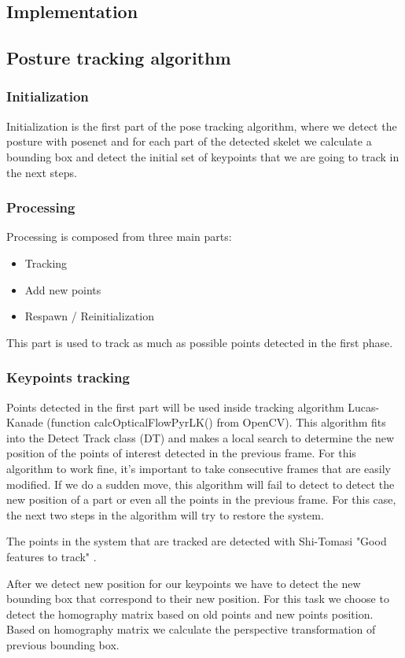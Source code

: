 \subsection{Implementation}
\subsection{Posture tracking algorithm}

\subsubsection{Initialization}
Initialization is the first part of the pose tracking algorithm, where we detect the posture with posenet and for each part of the detected skelet we calculate a bounding box and detect the initial set of keypoints that we are going to track in the next steps.
\subsubsection{Processing}
Processing is composed from three main parts: 
\begin{itemize}
    \item Tracking 
    \item Add new points 
    \item Respawn / Reinitialization
\end{itemize}
This part is used to track as much as possible points detected in the first phase.

\subsubsection{Keypoints tracking}
\par Points detected in the first part will be used inside tracking algorithm Lucas-Kanade \cite{Lucas:1981:IIR:1623264.1623280} (function calcOpticalFlowPyrLK() from OpenCV). This algorithm fits into the Detect Track  class (DT) and makes a local search to determine the new position of the points of interest detected in the previous frame. For this algorithm to work fine, it's important to take consecutive frames that are easily modified. If we do a sudden move, this algorithm will fail to detect to detect the new position of a part or even all the points in the previous frame. For this case, the next two steps in the algorithm will try to restore the system. 
\par The points in the system that are tracked are detected with Shi-Tomasi "Good features to track" \cite{323798}. 
\par After we detect new position for our keypoints we have to detect the new bounding box that correspond to their new position. For this task we choose to detect the homography matrix based on old points and new points position. Based on homography matrix we calculate the perspective transformation of previous bounding box.
